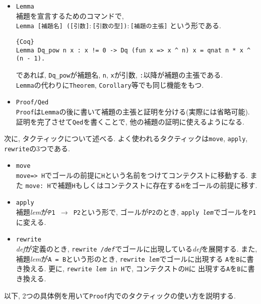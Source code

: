 \documentclass[11pt]{jarticle}
\theoremstyle{mystyle}
\newcommand{\0}{\textbf{0}}
\newcommand{\1}{\textbf{1}}
\newcommand{\2}{\textbf{2}}
\begin{document}
\begin{itemize}
    という形で用いる. 
    \begin{lstlisting}{Coq}
Definition dq (f : R -> R) x := f (q * x) - f x. \end{lstlisting}
    であれば, {\tt dq}が定義の名前, {\tt f}, {\tt x}が引数, {\tt R -> R}が{\tt f}の型であり, 
    {\tt f (q * x) - f x}が{\tt dq}を定義する式である. また, {\tt x}と{\tt dq}そのものの型は
    推論できるため省略できる. 
  \item {\tt Lemma} \\
    補題を宣言するためのコマンドで, \\
    {\tt Lemma [補題名] ([引数]$\colon$[引数の型])$\colon$[補題の主張]}
    という形である. 
    \begin{lstlisting}{Coq}
Lemma Dq_pow n x : x != 0 -> Dq (fun x => x ^ n) x = qnat n * x ^ (n - 1). \end{lstlisting}
    であれば, {\tt Dq\_pow}が補題名, {\tt n}, {\tt x}が引数, {\tt :}以降が補題の主張である. \\
    {\tt Lemma}の代わりに{\tt Theorem}, {\tt Corollary}等でも同じ機能をもつ. 
  \item {\tt Proof/Qed} \\
    {\tt Proof}は{\tt Lemma}の後に書いて補題の主張と証明を分ける(実際には省略可能). 
    証明を完了させて{\tt Qed}を書くことで, 他の補題の証明に使えるようになる. 
\end{itemize}
次に, タクティックについて述べる. よく使われるタクティックは{\tt move}, {\tt apply}, {\tt rewrite}の3つである. 
\begin{itemize}
  \item {\tt move}\\
    {\tt move=> H}でゴールの前提に{\tt H}という名前をつけてコンテクストに移動する. また
    {\tt move: H}で補題{\tt H}もしくはコンテクストに存在する{\tt H}をゴールの前提に移す. 
  \item {\tt apply}\\
    補題{\it lem}が{\tt P1 $\to$ P2}という形で, ゴールが{\tt P2}のとき, 
    {\tt apply {\it lem}}でゴールを{\tt P1}に変える. 
  \item {\tt rewrite}\\
    {\it def}が定義のとき, {\tt rewrite /{\it def}}でゴールに出現している{\it def}を展開する. 
    また, 補題{\it lem}が{\tt A = B}という形のとき, {\tt rewrite {\it lem}}でゴールに出現する
    {\tt A}を{\tt B}に書き換える. 更に, {\tt rewrite {\it lem} in H}で, コンテクストの{\tt H}に
    出現する{\tt A}を{\tt B}に書き換える. 
\end{itemize}
以下, 2つの具体例を用いて{\tt Proof}内でのタクティックの使い方を説明する. 
\end{document}
